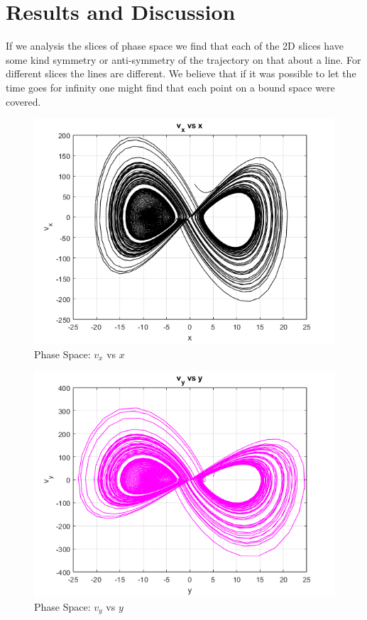 \documentclass[%
reprint,
amsmath,amssymb,
aps,
floatfix,
]{revtex4-2}
\begin{document}
	\section{Results and Discussion}
	If we analysis the slices of phase space we find that each of the 2D slices have some kind symmetry or anti-symmetry of the trajectory on that about a line. For different slices the lines are different. We believe that if it was possible to let the time goes for infinity one might find that each point on a bound space were covered. 
	\FloatBarrier
	\begin{figure}[htbp]
		\centering
		\includegraphics[width=0.8\linewidth]{v_x_vs_x.png}
		\caption{Phase Space: $v_x$ vs $x$}
		\label{fig:vx_x}
	\end{figure}
	
	\begin{figure}[htbp]
		\centering
		\includegraphics[width=0.8\linewidth]{v_y_vs_y.png}
		\caption{Phase Space: $v_y$ vs $y$}
		\label{fig:vy_y}
	\end{figure}
	
\end{document}
